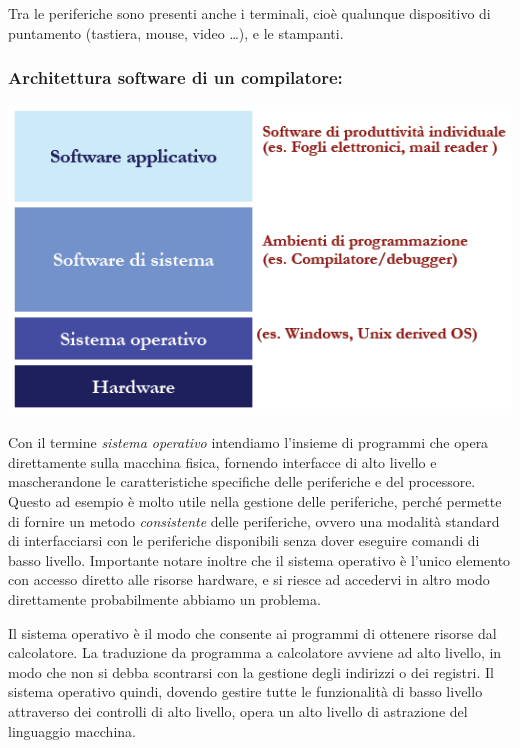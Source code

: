 \documentclass[
  paper=a4,
  oneside  ,captions=tableheading
]{scrbook}
\begin{document}
Tra le periferiche sono presenti anche i terminali, cioè qualunque
dispositivo di puntamento (tastiera, mouse, video \ldots), e le
stampanti.

\hypertarget{architettura-software-di-un-compilatore}{%
\subsubsection{Architettura software di un
compilatore:}\label{architettura-software-di-un-compilatore}}

\includegraphics{./image/image-20201112231919938.png}

Con il termine \emph{sistema operativo} intendiamo l'insieme di
programmi che opera direttamente sulla macchina fisica, fornendo
interfacce di alto livello e mascherandone le caratteristiche specifiche
delle periferiche e del processore. Questo ad esempio è molto utile
nella gestione delle periferiche, perché permette di fornire un metodo
\emph{consistente} delle periferiche, ovvero una modalità standard di
interfacciarsi con le periferiche disponibili senza dover eseguire
comandi di basso livello. Importante notare inoltre che il sistema
operativo è l'unico elemento con accesso diretto alle risorse hardware,
e si riesce ad accedervi in altro modo direttamente probabilmente
abbiamo un problema.

Il sistema operativo è il modo che consente ai programmi di ottenere
risorse dal calcolatore. La traduzione da programma a calcolatore
avviene ad alto livello, in modo che non si debba scontrarsi con la
gestione degli indirizzi o dei registri. Il sistema operativo quindi,
dovendo gestire tutte le funzionalità di basso livello attraverso dei
controlli di alto livello, opera un alto livello di astrazione del
linguaggio macchina.
\end{document}
